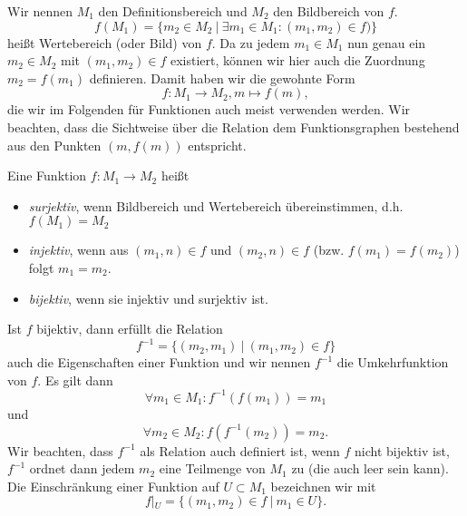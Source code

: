 Wir nennen \(M_1\) den Definitionsbereich und \(M_2\) den Bildbereich von \(f\).
\begin{equation*}
f(M_1) = \{m_2 \in M_2~|~\exists m_1 \in M_1: (m_1,m_2) \in f)\}
\end{equation*}
heißt Wertebereich (oder Bild) von \(f\).
Da zu jedem \(m_1 \in M_1\) nun genau ein \(m_2 \in M_2\) mit \((m_1,m_2) \in f\) existiert, können wir hier auch die Zuordnung \(m_2=f(m_1)\) definieren. Damit haben wir die gewohnte Form
\begin{equation*}
f: M_1 \rightarrow M_2, m \mapsto f(m),
\end{equation*}
die wir im Folgenden für Funktionen auch meist verwenden werden. Wir beachten, dass die Sichtweise über die Relation dem Funktionsgraphen bestehend aus den Punkten \((m,f(m))\) entspricht.
\label{grundlagen/mengenlogik:definition-11}
\begin{definition}{}{}



Eine Funktion \(f:M_1 \rightarrow M_2\) heißt
\begin{itemize}
\item {} 
\emph{surjektiv}, wenn Bildbereich und Wertebereich übereinstimmen, d.h. \(f(M_1)=M_2\)

\item {} 
\emph{injektiv}, wenn aus \((m_1,n) \in f\) und \((m_2,n) \in f\) (bzw. \(f(m_1) =f(m_2)\)) folgt \(m_1=m_2\).

\item {} 
\emph{bijektiv}, wenn sie injektiv und surjektiv ist.

\end{itemize}
\end{definition}

Ist \(f\) bijektiv, dann erfüllt die Relation
\begin{equation*}
 f^{-1} = \{(m_2,m_1) ~|~ (m_1,m_2) \in f\}
\end{equation*}
auch die Eigenschaften einer Funktion und wir nennen \(f^{-1}\) die Umkehrfunktion von \(f\). Es gilt dann
\begin{equation*}
\forall m_1 \in M_1: f^{-1}(f(m_1))=m_1
\end{equation*}
und
\begin{equation*}
\forall m_2 \in M_2: f(f^{-1}(m_2))=m_2.
\end{equation*}
Wir beachten, dass \(f^{-1}\) als Relation auch definiert ist, wenn \(f\) nicht bijektiv ist, \(f^{-1}\) ordnet dann jedem \(m_2\) eine Teilmenge von \(M_1\) zu (die auch leer sein kann).
Die Einschränkung einer Funktion auf \(U \subset M_1\) bezeichnen wir mit
\begin{equation*}
f|_U = \{ (m_1,m_2) \in f~|~ m_1 \in U\}.
\end{equation*}

